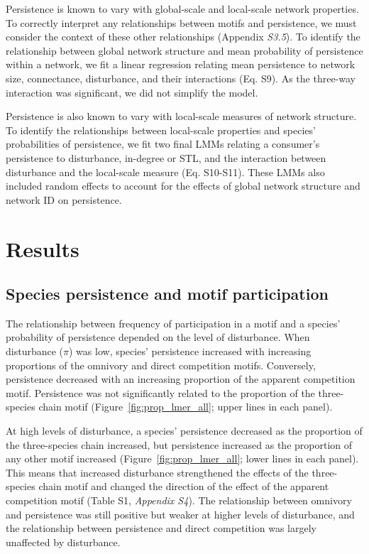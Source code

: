 \documentclass[12pt]{article}
\begin{document}
\begin{spacing}{2.0}
            Persistence is known to vary with global-scale and local-scale network properties.
            To correctly interpret any relationships between motifs and persistence, we must consider the context of these other relationships (Appendix \emph{S3.5}).
            To identify the relationship between global network structure and mean probability of persistence within a network, we fit a linear regression relating mean persistence to network size, connectance, disturbance, and their interactions (Eq. S9).
            As the three-way interaction was significant, we did not simplify the model. 


            Persistence is also known to vary with local-scale measures of network structure. 
            To identify the relationships between local-scale properties and species' probabilities of persistence, we fit two final LMMs relating a consumer's persistence to disturbance, in-degree or STL, and the interaction between disturbance and the local-scale measure (Eq. S10-S11).
            These LMMs also included random effects to account for the effects of global network structure and network ID on persistence.


\section*{Results}

    \subsection*{Species persistence and motif participation} 
       The relationship between frequency of participation in a motif and a species' probability of persistence depended on the level of disturbance. 
       When disturbance ($\pi$) was low, species' persistence increased with increasing proportions of the omnivory and direct competition motifs. 
       Conversely, persistence decreased with an increasing proportion of the apparent competition motif. 
       Persistence was not significantly related to the proportion of the three-species chain motif (Figure~\ref{fig:prop_lmer_all}; upper lines in each panel).
            
            
        At high levels of disturbance, a species' persistence decreased as the proportion of the three-species chain increased, but persistence increased as the proportion of any other motif increased (Figure~\ref{fig:prop_lmer_all}; lower lines in each panel). 
        This means that increased disturbance strengthened the effects of the three-species chain motif and changed the direction of the effect of the apparent competition motif  (Table S1, \emph{Appendix S4}).
        The relationship between omnivory and persistence was still positive but weaker at higher levels of disturbance, and the relationship between persistence and direct competition was largely unaffected by disturbance.


\end{spacing}
\end{document}
